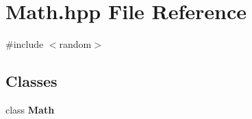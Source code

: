 \section{Math.\+hpp File Reference}
\label{_math_8hpp}
{\ttfamily \#include $<$random$>$}\newline
\subsection*{Classes}
\begin{DoxyCompactItemize}
\item 
class \textbf{ Math}
\end{DoxyCompactItemize}
